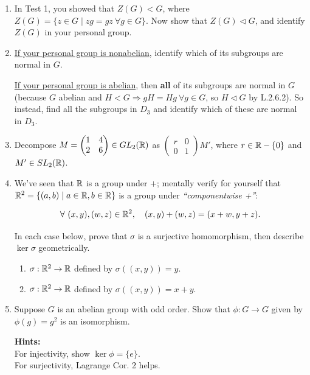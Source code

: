 \begin{enumerate}
    \item In Test 1, you showed that \( Z(G) < G \), where \( Z(G) = \{ z \in G \mid zg = gz \ \forall g \in G \} \). Now show that \( Z(G) \triangleleft G \), and identify \( Z(G) \) in your personal group. \\ \steezybreak

    \item \ul{If your personal group is nonabelian}, identify which of its subgroups are normal in \( G \).

    \ul{If your personal group is abelian}, then \textbf{all} of its subgroups are normal in \( G \) (because \( G \) abelian and \( H < G \Rightarrow gH = Hg \ \forall g \in G \), so \( H \triangleleft G \) by L.2.6.2). So instead, find all the subgroups in \( D_3 \) and identify which of these are normal in \( D_3 \). \\ \steezybreak


    \item Decompose \( M = \begin{pmatrix} 1 & 4 \\ 2 & 6 \end{pmatrix} \in GL_2({\mathbb{ R}}) \) as \( \begin{pmatrix} r & 0 \\ 0 & 1 \end{pmatrix} M' \), where \( r \in {\mathbb{ R}} - \{0\} \) and \( M' \in SL_2({\mathbb{ R}}) \). \\ \steezybreak
     

    \item We've seen that \( {\mathbb{ R}} \) is a group under \( + \); mentally verify for yourself that \( {\mathbb{ R}}^2 = \{(a,b) \mid a \in {\mathbb{ R}}, b \in {\mathbb{ R}} \} \) is a group under \textit{``componentwise +''}:
    
    \[
    \forall \ (x,y), (w,z) \in {\mathbb{ R}}^2, \quad (x,y) + (w,z) = (x+w, y+z).
    \]
    
    In each case below, prove that \( \sigma \) is a surjective homomorphism, then describe \( \ker \sigma \) geometrically.
    
    \begin{enumerate}
        \item \( \sigma: {\mathbb{ R}}^2 \to {\mathbb{ R}} \) defined by \( \sigma((x,y)) = y \).
        \item \( \sigma: {\mathbb{ R}}^2 \to {\mathbb{ R}} \) defined by \( \sigma((x,y)) = x+y \). \\ \steezybreak
        
    \end{enumerate} 

    \item Suppose \( G \) is an abelian group with odd order. Show that \( \phi: G \to G \) given by \( \phi(g) = g^2 \) is an isomorphism.

    \textbf{Hints:} \\
    For injectivity, show \( \ker \phi = \{e\} \). \\
    For surjectivity, Lagrange Cor. 2 helps.
\end{enumerate}
\newpage

